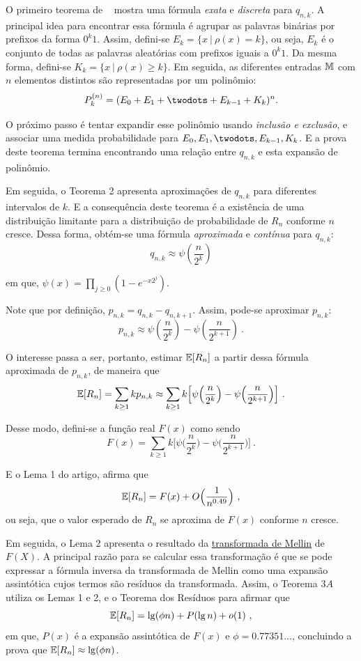 O primeiro teorema de ~\citep{flajolet:martin:85} mostra uma fórmula \textit{exata} e \textit{discreta} para $q_{n,k}$. 
A principal idea para encontrar essa fórmula é agrupar as palavras binárias por prefixos da forma $0^k1$. Assim, 
defini-se $E_k = \{ x  \ | \ \rho(x) = k \}$, ou seja, $E_k$ é o conjunto de todas as palavras aleatórias com prefixos
iguais a $0^k1$. Da mesma forma, defini-se $K_k = \{ x \ | \ \rho(x) \geq k \}$. Em seguida, as diferentes entradas 
$\mathbb{M}$ com $n$ elementos distintos são representadas por um polinômio:
\[ P_k^{(n)} = (E_0 + E_1 + \twodots + E_{k-1} + K_k)^n .\]

O próximo passo é tentar expandir esse polinômio usando \textit{inclusão e exclusão}, e associar uma medida 
probabilidade para $E_0, E_1, \twodots, E_{k-1}, K_k$. E a prova deste teorema termina encontrando uma relação entre 
$q_{n,k}$ e esta expansão de polinômio.

Em seguida, o Teorema 2 apresenta aproximações de $q_{n,k}$ para diferentes intervalos de $k$. E a consequência deste 
teorema é a existência de uma distribuição limitante para a distribuição de probabilidade de $R_n$ conforme $n$ cresce. 
Dessa forma, obtém-se uma fórmula \textit{aproximada} e \textit{contínua} para $q_{n,k}$:
\[ q_{n,k} \approx \psi(\frac{n}{2^k}) \]

em que, $\psi(x) = \prod_{j \geq 0} (1 - e^{-x2^j})$.

Note que por definição, $p_{n,k} = q_{n,k} - q_{n,k+1}$. Assim, pode-se aproximar $p_{n,k}$:
\[ p_{n,k} \approx \psi(\frac{n}{2^k}) - \psi(\frac{n}{2^{k+1}}) \ . \]

O interesse passa a ser, portanto, estimar $\mathbb{E}[R_n]$ a partir dessa fórmula aproximada de $p_{n,k}$, de maneira 
que 
\[ \mathbb{E}[R_n] = \sum_{k \geq 1} k p_{n,k} \approx \sum_{k \geq 1} k \Big[ \psi \Big( \frac{n}{2^k} \Big) - \psi 
  \Big( \frac{n}{2^{k+1}} \Big) \Big] \ . \]

Desse modo, defini-se a função real $F(x)$ como sendo
\[ F(x) =  \sum_{k \geq 1} k \Big[ \psi \Big( \frac{n}{2^k} \Big) - \psi \Big( \frac{n}{2^{k+1}} \Big) \Big] \ . \]

E o Lema 1 do artigo, afirma que 
\[ \mathbb{E}[R_n] = F(x) + O \Big( \frac{1}{n^{0.49}} \Big) \ , \]
ou seja, que o valor esperado de $R_n$ se aproxima de $F(x)$ conforme $n$ cresce.

Em seguida, o Lema 2 apresenta o resultado da \hyperref[ap:mellin]{transformada de Mellin} de $F(X)$. A principal razão 
para se calcular essa transformação é que se pode expressar a fórmula inversa da transformada de Mellin como uma 
expansão assintótica cujos termos são resíduos da transformada. Assim, o Teorema $3A$ utiliza os Lemas 1 e 2, e o 
Teorema dos Resíduos para afirmar que 
\[ \Ebb[R_n] = \lg (\phi n) + P(\lg n) + o(1) \ , \]
em que, $P(x)$ é a expansão assintótica de $F(x)$ e $\phi = 0.77351\dots$, concluindo a prova que 
$\mathbb{E}[R_n] \approx \lg (\phi n)$.

